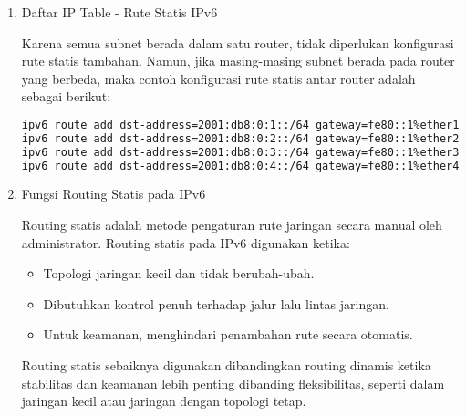 \begin{enumerate}
Router menghubungkan keempat subnet melalui empat antarmuka:

\begin{itemize}
    \item \textbf{ether1 (Subnet A):} \texttt{2001:db8:0:1::1/64}
    \item \textbf{ether2 (Subnet B):} \texttt{2001:db8:0:2::1/64}
    \item \textbf{ether3 (Subnet C):} \texttt{2001:db8:0:3::1/64}
    \item \textbf{ether4 (Subnet D):} \texttt{2001:db8:0:4::1/64}
\end{itemize}

{Konfigurasi IPv6 pada Router}

\begin{lstlisting}[language=bash]
interface ethernet ether1
    ipv6 address add address=2001:db8:0:1::1/64

interface ethernet ether2
    ipv6 address add address=2001:db8:0:2::1/64

interface ethernet ether3
    ipv6 address add address=2001:db8:0:3::1/64

interface ethernet ether4
    ipv6 address add address=2001:db8:0:4::1/64
\end{lstlisting}

    \item {Daftar IP Table - Rute Statis IPv6}

Karena semua subnet berada dalam satu router, tidak diperlukan konfigurasi rute statis tambahan. Namun, jika masing-masing subnet berada pada router yang berbeda, maka contoh konfigurasi rute statis antar router adalah sebagai berikut:

\begin{lstlisting}[language=bash]
ipv6 route add dst-address=2001:db8:0:1::/64 gateway=fe80::1%ether1
ipv6 route add dst-address=2001:db8:0:2::/64 gateway=fe80::1%ether2
ipv6 route add dst-address=2001:db8:0:3::/64 gateway=fe80::1%ether3
ipv6 route add dst-address=2001:db8:0:4::/64 gateway=fe80::1%ether4
\end{lstlisting}

    \item {Fungsi Routing Statis pada IPv6}

Routing statis adalah metode pengaturan rute jaringan secara manual oleh administrator. Routing statis pada IPv6 digunakan ketika:

\begin{itemize}
    \item Topologi jaringan kecil dan tidak berubah-ubah.
    \item Dibutuhkan kontrol penuh terhadap jalur lalu lintas jaringan.
    \item Untuk keamanan, menghindari penambahan rute secara otomatis.
\end{itemize}

Routing statis sebaiknya digunakan dibandingkan routing dinamis ketika stabilitas dan keamanan lebih penting dibanding fleksibilitas, seperti dalam jaringan kecil atau jaringan dengan topologi tetap.
\end{enumerate}